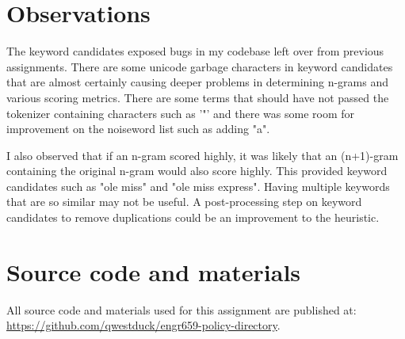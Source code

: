 \documentclass[a4paper,11pt]{article}
\theoremstyle{mytheor}
\begin{document}
\section*{Observations}

The keyword candidates exposed bugs in my codebase left over from previous assignments. There are some unicode garbage characters in keyword candidates that are almost certainly causing deeper problems in determining n-grams and various scoring metrics. There are some terms that should have not passed the tokenizer containing characters such as '"' and there was some room for improvement on the noiseword list such as adding "a".

I also observed that if an n-gram scored highly, it was likely that an (n+1)-gram containing the original n-gram would also score highly. This provided keyword candidates such as "ole miss" and "ole miss express". Having multiple keywords that are so similar may not be useful. A post-processing step on keyword candidates to remove duplications could be an improvement to the heuristic.

\section*{Source code and materials}
All source code and materials used for this assignment are published at: \url{https://github.com/qwestduck/engr659-policy-directory}.
\end{document}
